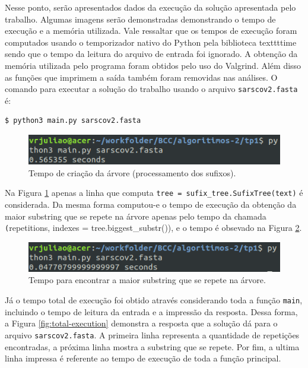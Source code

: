 Nesse ponto, serão apresentados dados da execução da solução apresentada pelo
trabalho.
Algumas imagens serão demonstradas demonstrando o tempo de execução e a memória
utilizada.
Vale ressaltar que os tempos de execução foram computados usando o temporizador
nativo do Python pela biblioteca texttt{time} sendo que o tempo da leitura do
arquivo de entrada foi ignorado.
A obtenção da memória utilizada pelo programa foram obtidos pelo uso do Valgrind.
Além disso as funções que imprimem a saída também foram removidas nas análises.
O comando para executar a solução do trabalho usando o arquivo
\texttt{sarscov2.fasta} é:

\lstset{language=bash}
\begin{lstlisting}[frame=single]
$ python3 main.py sarscov2.fasta
\end{lstlisting}

\begin{figure}[h]
	\begin{center}
		\includegraphics[scale=0.75]{Figuras/create-trie.png}
	\end{center}
	\caption{\label{fig:create-trie} Tempo de criação da árvore (processamento dos sufixos).}
\end{figure}

Na Figura \ref{fig:create-trie} apenas a linha que computa
\texttt{tree = sufix\_tree.SufixTree(text)} é considerada.
Da mesma forma computou-e o tempo de execução da obtenção da maior substring
que se repete na árvore apenas pelo tempo da chamada
\texttt(repetitions, indexes = tree.biggest\_substr()), e o tempo é obsevado
na Figura \ref{fig:biggest-substr}.

\begin{figure}[h]
	\begin{center}
		\includegraphics[scale=0.75]{Figuras/biggest-substr.png}
	\end{center}
	\caption{\label{fig:biggest-substr} Tempo para encontrar a maior substring que se repete na árvore.}
\end{figure}

Já o tempo total de execução foi obtido através considerando toda a função
\texttt{main}, incluindo o tempo de leitura da entrada e a impressão da resposta.
Dessa forma, a Figura \ref{fig:total-execution} demonstra a resposta que a
solução dá para o arquivo \texttt{sarscov2.fasta}.
A primeira linha representa a quantidade de repetições encontradas, a próxima
linha mostra a substring que se repete.
Por fim, a ultima linha impressa é referente ao tempo de execução de toda a
função principal.

